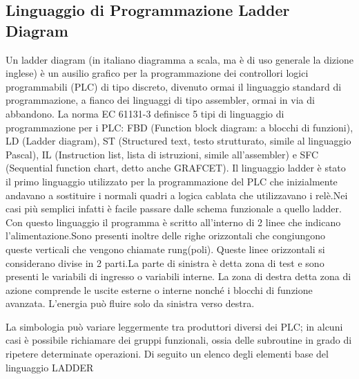 \documentclass[12pt, a4paper, oneside]{book}
\begin{document}
\subsection{Linguaggio di Programmazione Ladder Diagram}
Un ladder diagram (in italiano diagramma a scala, ma è di uso generale la dizione inglese) è un ausilio grafico per la programmazione dei controllori logici programmabili (PLC) di tipo discreto, divenuto ormai il linguaggio standard di programmazione, a fianco dei linguaggi di tipo assembler, ormai in via di abbandono. La norma EC 61131-3 definisce 5 tipi di linguaggio di programmazione per i PLC: FBD (Function block diagram: a blocchi di funzioni), LD (Ladder diagram), ST (Structured text, testo strutturato, simile al linguaggio Pascal), IL (Instruction list, lista di istruzioni, simile all'assembler) e SFC (Sequential function chart, detto anche GRAFCET). Il linguaggio ladder è stato il primo linguaggio utilizzato per la programmazione del PLC che inizialmente andavano a sostituire i normali quadri a logica cablata che utilizzavano i relè.Nei casi più semplici infatti è facile passare dalle schema funzionale a quello ladder. Con questo linguaggio il programma è scritto all'interno di 2 linee che indicano l'alimentazione.Sono presenti inoltre delle righe orizzontali che congiungono queste verticali che vengono chiamate rung(poli). Queste linee orizzontali si considerano divise in 2 parti.La parte di sinistra è detta zona di test e sono presenti le variabili di ingresso o variabili interne. La zona di destra detta zona di azione comprende le uscite esterne o interne nonché i blocchi di funzione avanzata. L'energia può fluire solo da sinistra verso destra.

La simbologia può variare leggermente tra produttori diversi dei PLC; in alcuni casi è possibile richiamare dei gruppi funzionali, ossia delle subroutine in grado di ripetere determinate operazioni. Di seguito un elenco degli elementi base del linguaggio LADDER
\end{document}

